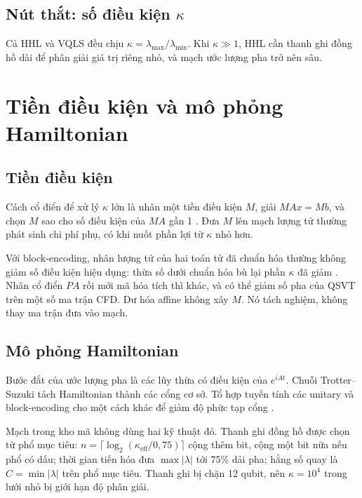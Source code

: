 \documentclass[11pt,a4paper]{article}
\newenvironment{revisedblock}{\par\color{revised}\ignorespaces}{\par}
\begin{document}
\subsection{Nút thắt: số điều kiện \(\kappa\)}
Cả HHL và VQLS đều chịu \(\kappa=\lambda_{\max}/\lambda_{\min}\).
Khi \(\kappa\gg 1\), HHL cần thanh ghi đồng hồ dài để phân giải giá trị riêng nhỏ, và mạch ước lượng pha trở nên sâu.

\section{Tiền điều kiện và mô phỏng Hamiltonian}

\subsection{Tiền điều kiện}
Cách cổ điển để xử lý \(\kappa\) lớn là nhân một tiền điều kiện \(M\), giải \(MAx=Mb\), và chọn \(M\) sao cho số điều kiện của \(MA\) gần 1 \citep{clader2013}.
Đưa \(M\) lên mạch lượng tử thường phát sinh chi phí phụ, có khi nuốt phần lợi từ \(\kappa\) nhỏ hơn.

\begin{revisedblock}
Với block-encoding, nhân lượng tử của hai toán tử đã chuẩn hóa thường không giảm số điều kiện hiệu dụng: thừa số dưới chuẩn hóa bù lại phần \(\kappa\) đã giảm \citep{lapworth2025}.
Nhân cổ điển \(PA\) rồi mới mã hóa tích thì khác, và có thể giảm số pha của QSVT trên một số ma trận CFD.
Dư hóa affine không xây \(M\).
Nó tách nghiệm, không thay ma trận đưa vào mạch.
\end{revisedblock}

\subsection{Mô phỏng Hamiltonian}
Bước đắt của ước lượng pha là các lũy thừa có điều kiện của \(e^{iAt}\).
Chuỗi Trotter--Suzuki tách Hamiltonian thành các cổng cơ sở.
Tổ hợp tuyến tính các unitary và block-encoding cho một cách khác để giảm độ phức tạp cổng \citep{gilyen2019}.

\begin{revisedblock}
Mạch trong kho mã không dùng hai kỹ thuật đó.
Thanh ghi đồng hồ được chọn từ phổ mục tiêu:
\(n=\lceil\log_2(\kappa_{\mathrm{eff}}/0{,}75)\rceil\) cộng thêm bit, cộng một bit nữa nếu phổ có dấu;
thời gian tiến hóa đưa \(\max\lvert\lambda\rvert\) tới 75\% dải pha;
hằng số quay là \(C=\min\lvert\lambda\rvert\) trên phổ mục tiêu.
Thanh ghi bị chặn 12 qubit, nên \(\kappa=10^{4}\) trong lưới nhỏ bị giới hạn độ phân giải.
\end{revisedblock}
\end{document}
